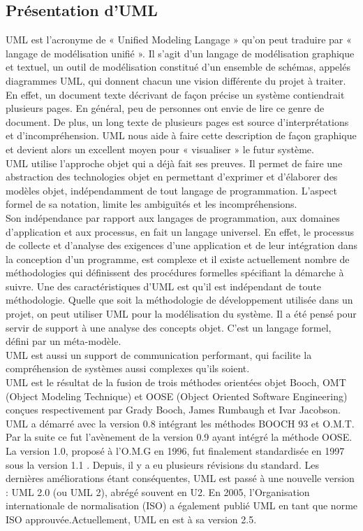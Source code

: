 \subsection{Présentation d'UML}
UML est l’acronyme de « Unified Modeling Langage »  qu'on peut traduire par « langage de modélisation unifié ». Il s'agit d'un langage de modélisation graphique et textuel, un outil de modélisation constitué d’un ensemble de schémas, appelés diagrammes UML, qui donnent chacun une vision différente du projet à traiter. En effet, un document texte décrivant de façon précise un système contiendrait plusieurs pages. En général, peu de personnes ont envie de lire ce genre de document. De plus, un long texte de plusieurs pages est source d’interprétations et d’incompréhension. UML nous aide à faire cette description de façon graphique et devient alors un excellent moyen pour « visualiser » le futur système.\\
UML utilise l'approche objet qui a déjà fait ses preuves. Il permet de faire une abstraction des technologies objet en permettant d’exprimer et d’élaborer des modèles objet, indépendamment de tout langage de programmation. L'aspect formel de sa notation, limite les ambiguïtés et les incompréhensions.\\
Son indépendance par rapport aux langages de programmation, aux domaines d'application et
aux processus, en fait un langage universel. En effet, le processus de collecte et d'analyse des exigences d'une application et de leur intégration dans la conception d'un programme, est complexe et il existe actuellement nombre de  méthodologies qui définissent des procédures formelles spécifiant la démarche à suivre. Une des caractéristiques d'UML est qu'il est indépendant de toute méthodologie. Quelle que soit la méthodologie de développement utilisée dans un projet, on peut utiliser UML pour la modélisation du système. Il a été pensé pour servir de support à une analyse des concepts objet. C’est un langage formel, défini par un méta-modèle.\\
UML est aussi un support de communication performant, qui facilite la compréhension de systèmes  aussi complexes qu'ils soient.\\
UML est le résultat de la fusion de trois méthodes orientées objet Booch, OMT (Object Modeling Technique) et OOSE (Object Oriented Software Engineering)   conçues respectivement par Grady Booch, James Rumbaugh et Ivar Jacobson. UML a démarré avec la version 0.8 intégrant les méthodes BOOCH 93 et O.M.T. Par la suite ce fut l'avènement de la version 0.9 ayant intégré la méthode OOSE. La version 1.0, proposé à l'O.M.G en 1996, fut finalement standardisée en 1997 sous la version 1.1 . Depuis, il y a eu plusieurs révisions du standard. Les dernières améliorations étant conséquentes, UML est passé à une nouvelle version : UML 2.0 (ou UML 2), abrégé souvent en U2. En 2005, l'Organisation internationale de normalisation (ISO) a également publié UML en tant que norme ISO approuvée.Actuellement, UML en est à sa version 2.5.
